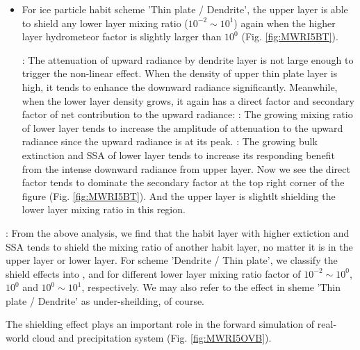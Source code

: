 \begin{itemize}
    \item {}
    For ice particle habit scheme 'Thin plate / Dendrite', the upper layer is able to shield any lower layer mixing ratio ($10^{-2} \sim 10^{1}$) again 
when the higher layer hydrometeor factor is slightly larger than $10^{0}$ (Fig. \ref{fig:MWRI5BT}).

    :
    The attenuation of upward radiance by dendrite layer is not large enough to trigger the non-linear effect.  
When the density of upper thin plate layer is high, it tends to enhance the downward radiance significantly.
Meanwhile, when the lower layer density grows, it again has a direct factor and secondary factor of net contribution to the upward radiance:
    : The growing mixing ratio of lower layer tends to increase the amplitude of attenuation to the upward radiance since the upward radiance 
is at its peak.
    : The growing bulk extinction and SSA of lower layer tends to increase its responding benefit from the intense downward radiance from upper layer.
    Now we see the direct factor tends to dominate the secondary factor at the top right corner of the figure (Fig. \ref{fig:MWRI5BT}). 
And the upper layer is slightlt shielding the lower layer mixing ratio in this region.
\end{itemize}

: From the above analysis, we find that the habit layer with higher extiction and SSA tends to shield the mixing ratio of another habit layer, no matter
it is in the upper layer or lower layer. 
    For scheme 'Dendrite / Thin plate', we classify the shield effects into ,  and  for different
lower layer mixing ratio factor of $10^{-2} \sim 10^{0}$, $10^{0}$ and $10^{0} \sim 10^{1}$, respectively. We may also refer to the effect in sheme 'Thin plate / Dendrite'
as under-sheilding, of course.

    The shielding effect plays an important role in the forward simulation of real-world cloud and precipitation system (Fig. \ref{fig:MWRI5OVB}).


